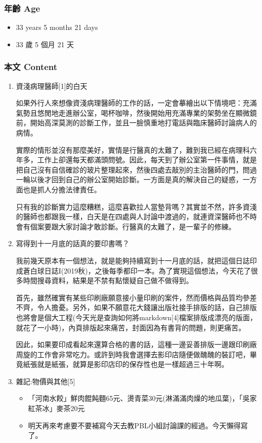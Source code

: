 \documentclass[a5paper, 12pt
]{book}
\providecommand{\tightlist}{%
  \setlength{\itemsep}{0pt}\setlength{\parskip}{0pt}}
\begin{document}
\hypertarget{ux5e74ux9f61-age-15}{%
\subsubsection{年齡 Age}\label{ux5e74ux9f61-age-15}}

\begin{itemize}
\tightlist
\item
  33 years 5 months 21 days
\item
  33 歲 5 個月 21 天
\end{itemize}

\hypertarget{ux672cux6587-content-15}{%
\subsubsection{本文 Content}\label{ux672cux6587-content-15}}

\begin{enumerate}
\def\labelenumi{\arabic{enumi}.}
\item
  資淺病理醫師{[}1{]}的白天

  如果外行人來想像資淺病理醫師的工作的話，一定會摹繪出以下情境吧：充滿氣勢且悠閒地走進辦公室，喝杯咖啡，然後開始用充滿專業的架勢坐在顯微鏡前，開始高深莫測的診斷工作，並且一臉慎重地打電話與臨床醫師討論病人的病情。

  實際的情形並沒有那麼美好，實情是行醫真的太難了，難到我已經在病理科六年多，工作上卻還每天都滿頭問號。因此，每天到了辦公室第一件事情，就是把自己沒有自信確診的玻片整理起來，然後四處去敲別的主治醫師的門，問過一輪以後才回到自己的辦公室開始診斷。一方面是真的解決自己的疑惑，一方面也是抓人分擔法律責任。

  只有我的診斷實力這麼糟糕，這麼喜歡拉人當墊背嗎？其實並不然，許多資淺的醫師也都跟我一樣，白天是在四處與人討論中渡過的，就連資深醫師也不時會有個案要跟大家討論才敢診斷。行醫真的太難了，是一輩子的修練。
\item
  寫得到十一月底的話真的要印書嗎？

  我前幾天原本有一個想法，就是能夠持續寫到十一月底的話，就把這個日誌印成蒼白球日誌I(2019秋)，之後每季都印一本。為了實現這個想法，今天花了很多時間搜尋資料，結果是不禁有點懷疑自己做不做得到。

  首先，雖然確實有某些印刷廠願意接小量印刷的案件，然而價格與品質均參差不齊，令人擔憂。另外，如果不願意花大錢讓出版社接手排版的話，自己排版也將會是個大工程(今天光是查詢如何將markdown{[}4{]}檔案排版成漂亮的版面，就花了一小時)，內頁排版起來痛苦，封面因為有書背的問題，則更痛苦。

  因此，如果要印成看起來還算合格的書的話，這種一邊妥善排版一邊跟印刷廠周旋的工作會非常吃力。或許到時我會選擇去影印店隨便做醜醜的裝訂吧，畢竟紙張就是紙張，就算是影印店印的保存性也是一樣超過三十年啊。
\item
  雜記:物價與其他{[}5{]}

  \begin{itemize}
  \tightlist
  \item
    「河南水餃」鮮肉餛飩麵65元、燙青菜30元(淋滿滿肉燥的地瓜葉)，「吳家紅茶冰」麥茶20元
  \item
    明天再來考慮要不要補寫今天去教PBL小組討論課的經過。今天懶得寫了。
  \end{itemize}
\end{enumerate}
\end{document}
